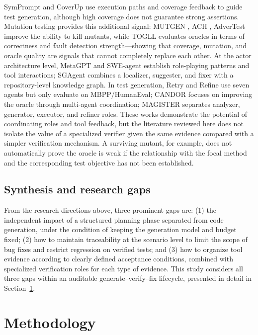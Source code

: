 \documentclass[pdflatex,sn-basic,Numbered,iicol]{sn-jnl}
\begin{document}
SymPrompt \cite{bib11} and CoverUp \cite{bib12} use execution paths and coverage feedback to guide test generation, although high coverage does not guarantee strong assertions. Mutation testing provides this additional signal: MUTGEN \cite{bib13}, ACH \cite{bib14}, AdverTest \cite{bib15} improve the ability to kill mutants, while TOGLL \cite{bib16} evaluates oracles in terms of correctness and fault detection strength---showing that coverage, mutation, and oracle quality are signals that cannot completely replace each other. At the actor architecture level, MetaGPT \cite{bib17} and SWE-agent \cite{bib18} establish role-playing patterns and tool interactions; SGAgent \cite{bib20} combines a localizer, suggester, and fixer with a repository-level knowledge graph. In test generation, Retry and Refine \cite{bib21} use seven agents but only evaluate on MBPP/HumanEval; CANDOR \cite{bib22} focuses on improving the oracle through multi-agent coordination; MAGISTER \cite{bib31} separates analyzer, generator, executor, and refiner roles. These works demonstrate the potential of coordinating roles and tool feedback, but the literature reviewed here does not isolate the value of a specialized verifier given the same evidence compared with a simpler verification mechanism. A surviving mutant, for example, does not automatically prove the oracle is weak if the relationship with the focal method and the corresponding test objective has not been established.

\subsection{Synthesis and research gaps}\label{subsec:rw-synthesis}

From the research directions above, three prominent gaps are: (1) the independent impact of a structured planning phase separated from code generation, under the condition of keeping the generation model and budget fixed; (2) how to maintain traceability at the scenario level to limit the scope of bug fixes and restrict regression on verified tests; and (3) how to organize tool evidence according to clearly defined acceptance conditions, combined with specialized verification roles for each type of evidence. This study considers all three gaps within an auditable generate--verify--fix lifecycle, presented in detail in Section~\ref{sec:methodology}.

\section{Methodology}\label{sec:methodology}
\end{document}
